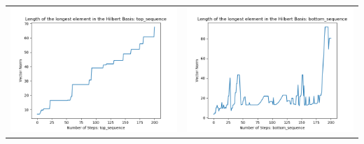 \documentclass[10pt]{article}
\begin{document}
\begin{tabular}{c|c}
\begin{minipage}{.4\textwidth}
\includegraphics[width=\textwidth]{"DATA/5d/6 generators 2 bound B/top_sequence LENGTH"}
\end{minipage} &
\begin{minipage}{.4\textwidth}
\includegraphics[width=\textwidth]{"DATA/5d/6 generators 2 bound B bottomup/bottom_sequence LENGTH"}
\end{minipage}
\end{tabular}
\end{document}
